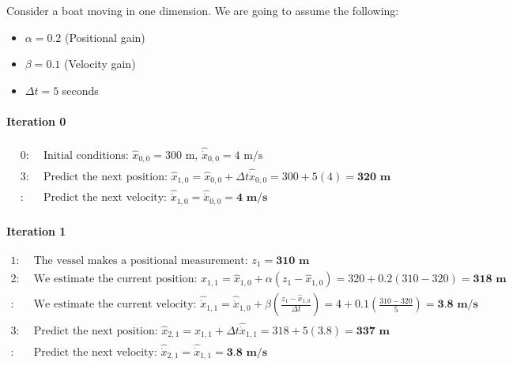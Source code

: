 
        \begin{example} \label{ex:alpha_beta_filter}
        Consider a boat moving in one dimension. 
        We are going to assume the following:
        \begin{itemize}
            \item $\alpha = 0.2$ (Positional gain)
            \item $\beta = 0.1$ (Velocity gain)
            \item $\Delta t = 5$ seconds
        \end{itemize}

        \paragraph{Iteration 0}
        \begin{equation*}
            \begin{aligned} 
                0:& \text{ Initial conditions: } \hat{x}_{0,0} = 300 \text{ m, } \hat{\dot{x}}_{0,0} = 4 \text{ m/s} \\
                3:& \text{ Predict the next position: } \hat{x}_{1,0} = \hat{x}_{0,0} + \Delta t \hat{\dot{x}}_{0,0} = 300 + 5(4) = \textbf{320 m} \\
                 :& \text{ Predict the next velocity: } \hat{\dot{x}}_{1,0} = \hat{\dot{x}}_{0,0} = \textbf{4 m/s}
            \end{aligned}
        \end{equation*}
        
        \paragraph{Iteration 1}
        \begin{equation*}
            \begin{aligned} 
                1:& \text{ The vessel makes a positional measurement: } z_1 = \textbf{310 m} \\
                2:& \text{ We estimate the current position: } \hat{x}_{1,1} = \hat{x}_{1,0} + \alpha(z_1 - \hat{x}_{1,0}) = 320 + 0.2(310 - 320) = \textbf{318 m} \\
                 :& \text{ We estimate the current velocity: } \hat{\dot{x}}_{1,1} = \hat{\dot{x}}_{1,0} + \beta(\frac{z_1 - \hat{x}_{1,0}}{\Delta t}) = 4 + 0.1(\frac{310 - 320}{5}) = \textbf{3.8 m/s} \\
                3:& \text{ Predict the next position: } \hat{x}_{2,1} = \hat{x}_{1,1} + \Delta t \hat{\dot{x}}_{1,1} = 318 + 5(3.8) = \textbf{337 m} \\
                 :& \text{ Predict the next velocity: } \hat{\dot{x}}_{2,1} = \hat{\dot{x}}_{1,1} = \textbf{3.8 m/s}
            \end{aligned}
        \end{equation*}


\end{example}
